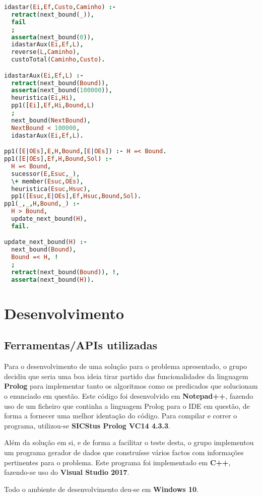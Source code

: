 \documentclass[a4paper]{article}
\begin{document}
\begin{lstlisting}[language=Prolog,xleftmargin=.2\textwidth]
idastar(Ei,Ef,Custo,Caminho) :-
  retract(next_bound(_)),
  fail
  ;
  asserta(next_bound(0)),
  idastarAux(Ei,Ef,L),
  reverse(L,Caminho),
  custoTotal(Caminho,Custo).

idastarAux(Ei,Ef,L) :-
  retract(next_bound(Bound)),
  asserta(next_bound(100000)),
  heuristica(Ei,Hi),
  pp1([Ei],Ef,Hi,Bound,L)
  ;
  next_bound(NextBound),
  NextBound < 100000,
  idastarAux(Ei,Ef,L).

pp1([E|OEs],E,H,Bound,[E|OEs]) :- H =< Bound.
pp1([E|OEs],Ef,H,Bound,Sol) :-
  H =< Bound,
  sucessor(E,Esuc,_),
  \+ member(Esuc,OEs),
  heuristica(Esuc,Hsuc),
  pp1([Esuc,E|OEs],Ef,Hsuc,Bound,Sol).
pp1(_,_,H,Bound,_) :-
  H > Bound,
  update_next_bound(H),
  fail.

update_next_bound(H) :-
  next_bound(Bound),
  Bound =< H, !
  ;
  retract(next_bound(Bound)), !,
  asserta(next_bound(H)).
\end{lstlisting}

\newpage

\section{Desenvolvimento}

\subsection{Ferramentas/APIs utilizadas} 

Para o desenvolvimento de uma solução para o problema apresentado, o grupo decidiu que seria uma boa ideia tirar partido das funcionalidades da linguagem \textbf{Prolog} para implementar tanto os algoritmos como os predicados que solucionam o enunciado em questão. Este código foi desenvolvido em \textbf{Notepad++}, fazendo uso de um ficheiro que continha a linguagem Prolog para o IDE em questão, de forma a fornecer uma melhor identação do código. Para compilar e correr o programa, utilizou-se \textbf{SICStus Prolog VC14 4.3.3}.

Além da solução em si, e de forma a facilitar o teste desta, o grupo implementou um programa gerador de dados que construísse vários factos com informações pertinentes para o problema. Este programa foi implementado em \textbf{C++}, fazendo-se uso do \textbf{Visual Studio 2017}.

Todo o ambiente de desenvolvimento deu-se em \textbf{Windows 10}.
\end{document}
